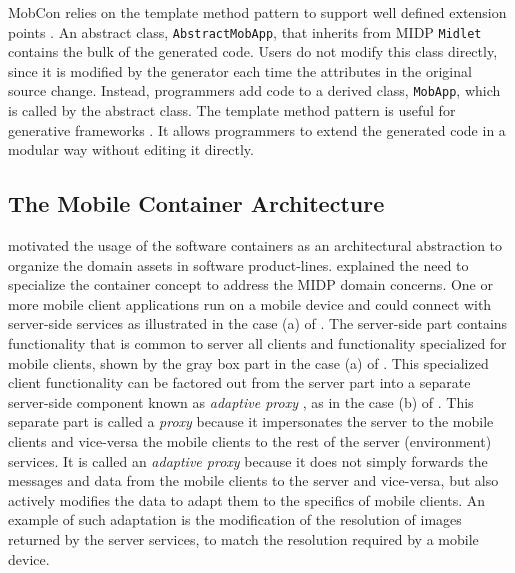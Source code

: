 MobCon relies on the template method pattern \cite{dpatterns} to support well defined extension points . An abstract class, {\tt AbstractMobApp}, that inherits from MIDP {\tt Midlet} contains the bulk of the generated code. Users do not modify this class directly, since it is modified by the generator each time the attributes in the original source change. Instead, programmers add code to a derived class, {\tt MobApp}, which is called by the abstract class. 
The  template method pattern is useful for generative frameworks \cite{voelter.generation}. It allows programmers to extend the generated code in a modular way without editing it directly.

\subsection{The Mobile Container Architecture}
\label{sec.mc.arch}

 motivated the usage of the software containers as an architectural abstraction to organize the domain assets in software product-lines.  explained the need to specialize the container concept to address the MIDP domain concerns. One or more mobile client applications run on a mobile device and could connect with server-side services as illustrated in the case (a) of . The server-side part contains functionality that is common to server all clients and functionality specialized for mobile clients, shown by the gray box part in the case (a) of . This specialized client functionality can be factored out from the server part into a separate server-side component known as \textit{adaptive proxy} \cite{fox98adapting}, as in the case (b) of . This separate part is called a \textit{proxy} because it impersonates the server to the mobile clients and vice-versa the mobile clients to the rest of the server (environment) services. It is called an \textit{adaptive proxy} because it does not simply forwards the messages and data from the mobile clients to the server and vice-versa, but also actively modifies the data to adapt them to the specifics of mobile clients. An example of such adaptation is the modification of the resolution of images returned by the server services, to match the resolution required by a mobile device.

